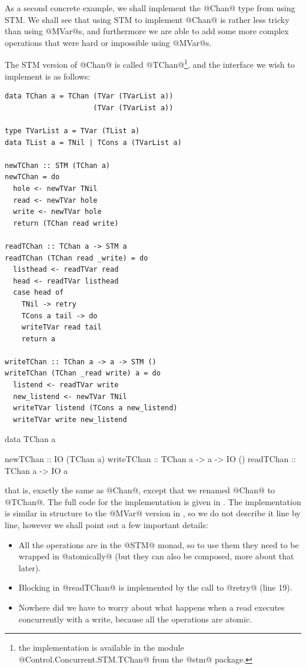 
As a second concrete example, we shall implement the @Chan@ type from
 using STM.  We shall see that using STM to implement
@Chan@ is rather less tricky than using @MVar@s, and furthermore we
are able to add some more complex operations that were hard or
impossible using @MVar@s.

The STM version of @Chan@ is called @TChan@\footnote{the implementation
  is available in the module @Control.Concurrent.STM.TChan@ from the
  @stm@ package.}, and the interface we wish to implement is as
follows:

\begin{lstlisting}[float,label=lst:tchan,caption=implementation of \texttt{TChan},language=HaskellUlisses,style=numbers]
data TChan a = TChan (TVar (TVarList a))
                     (TVar (TVarList a))

type TVarList a = TVar (TList a)
data TList a = TNil | TCons a (TVarList a)

newTChan :: STM (TChan a)
newTChan = do
  hole <- newTVar TNil
  read <- newTVar hole
  write <- newTVar hole
  return (TChan read write)

readTChan :: TChan a -> STM a
readTChan (TChan read _write) = do
  listhead <- readTVar read
  head <- readTVar listhead
  case head of
    TNil -> retry
    TCons a tail -> do
	writeTVar read tail
	return a

writeTChan :: TChan a -> a -> STM ()
writeTChan (TChan _read write) a = do
  listend <- readTVar write
  new_listend <- newTVar TNil
  writeTVar listend (TCons a new_listend)
  writeTVar write new_listend
\end{lstlisting}

\begin{haskell}
data TChan a

newTChan   :: IO (TChan a)
writeTChan :: TChan a -> a -> IO ()
readTChan  :: TChan a -> IO a
\end{haskell}

\noindent that is, exactly the same as @Chan@, except that we renamed
@Chan@ to @TChan@.  The full code for the implementation is given in
.  The implementation is similar in structure to the
@MVar@ version in , so we do not describe it line by
line, however we shall point out a few important details:

\begin{itemize}
\item All the operations are in the @STM@ monad, so to use them they
  need to be wrapped in @atomically@ (but they can also be composed,
  more about that later).
\item Blocking in @readTChan@ is implemented by the call to @retry@
  (line 19).
\item Nowhere did we have to worry about what happens when a read
  executes concurrently with a write, because all the operations are
  atomic.
\end{itemize}

